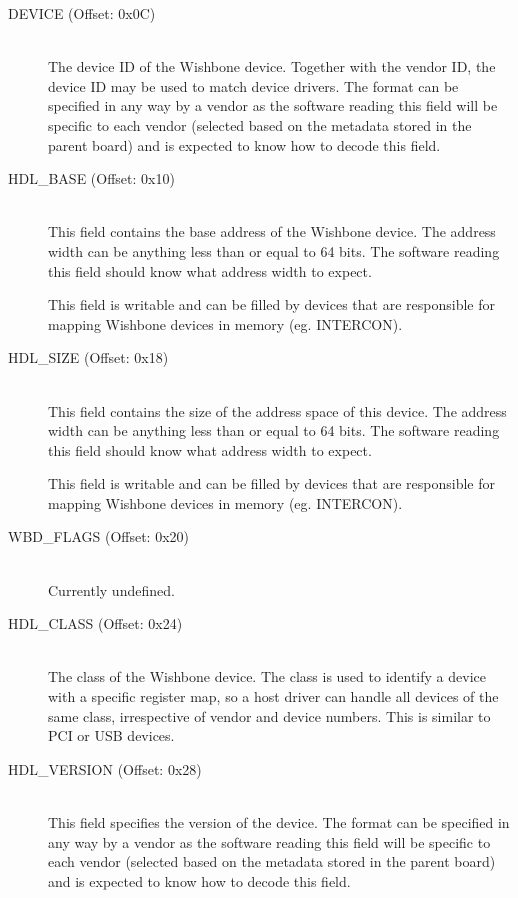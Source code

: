 \documentclass{article}
\begin{document}
\begin{description}
\item[DEVICE (Offset: 0x0C)] \hfill \\
The device ID of the Wishbone device. Together with the vendor ID, the
device ID may be used to match device drivers. The format can be specified
in any way by a vendor as the software reading this field will be
specific to each vendor (selected based on the metadata stored in the
parent board) and is expected to know how to decode this field.

\item[HDL\_BASE (Offset: 0x10)] \hfill \\
This field contains the base address of the Wishbone device. The address width
can be anything less than or equal to 64 bits. The software reading this
field should know what address width to expect.

This field is writable and can be filled by devices that are responsible
for mapping Wishbone devices in memory (eg. INTERCON).

\item[HDL\_SIZE (Offset: 0x18)] \hfill \\
This field contains the size of the address space of this device. The address width
can be anything less than or equal to 64 bits. The software reading this
field should know what address width to expect.

This field is writable and can be filled by devices that are responsible
for mapping Wishbone devices in memory (eg. INTERCON).

\item[WBD\_FLAGS (Offset: 0x20)] \hfill \\
Currently undefined.

\item[HDL\_CLASS (Offset: 0x24)] \hfill \\
The class of the Wishbone device. The class is used to identify a device
with a specific register map, so a host driver can handle all devices of
the same class, irrespective of vendor and device numbers. This is similar
to PCI or USB devices.

\item[HDL\_VERSION (Offset: 0x28)] \hfill \\
This field specifies the version of the device. The format can be specified
in any way by a vendor as the software reading this field will be
specific to each vendor (selected based on the metadata stored in the
parent board) and is expected to know how to decode this field.


\end{description}
\end{document}
